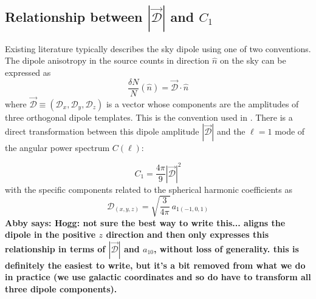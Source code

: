 \documentclass[modern]{aastex631}
\newcommand{\abby}[1]{\textbf{Abby says: #1}}
\begin{document}
\subsection{Relationship between $|\vec{\mathcal{D}}|$ and $C_1$}

Existing literature typically describes the sky dipole using one of two conventions.
The dipole anisotropy in the source counts in direction $\hat n$ on the sky can be expressed as
\begin{equation}
    \frac{\delta N}{N}(\hat n) = \vec{\mathcal{D}}\cdot \hat n
\end{equation}
where $\vec{\mathcal{D}}\equiv(\mathcal{D}_x,\mathcal{D}_y,\mathcal{D}_z)$ is a vector whose components are the amplitudes of three orthogonal dipole templates.
This is the convention used in \citet{secrest_test_2021}.
There is a direct transformation between this dipole amplitude $|\vec{\mathcal{D}}|$ and the $\ell=1$ mode of the angular power spectrum $C(\ell)$:

\begin{equation}
    C_1 = \frac{4\pi}{9}|\vec{\mathcal{D}}|^2
\end{equation}
with the specific components related to the spherical harmonic coefficients as
\begin{equation}
    \mathcal{D}_{(x,y,z)} = \sqrt{\frac{3}{4\pi}}\,a_{1(-1,0,1)}
\end{equation}
\abby{Hogg: not sure the best way to write this... \citet{gibelyou_dipoles_2012} aligns the dipole in the positive $z$ direction and then only expresses this relationship in terms of $|\vec{\mathcal{D}}|$ and $a_{10}$, without loss of generality. this is definitely the easiest to write, but it's a bit removed from what we do in practice (we use galactic coordinates and so do have to transform all three dipole components).}
\end{document}
